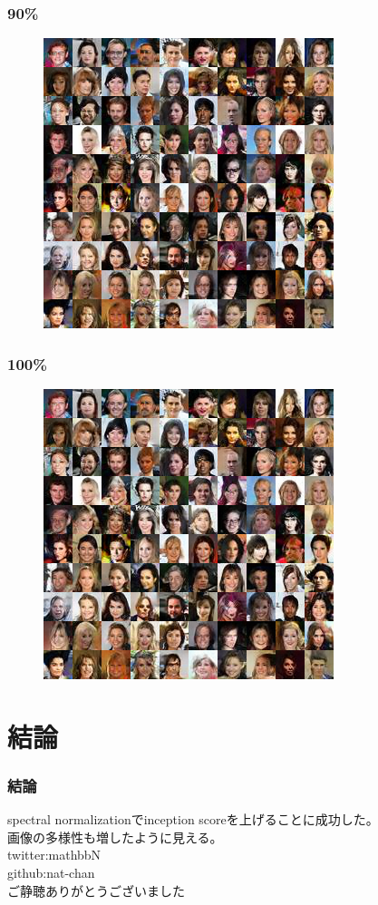 \documentclass[dvipdfmx,12pt]{beamer}
\begin{document}
\begin{frame}
	\frametitle{90\%}
	\begin{figure}[htbp]
	\begin{center}
	\includegraphics[width=0.7\hsize]{./sndcgan/image00090000.png}
	\end{center}
	\end{figure}
\end{frame}
\begin{frame}
	\frametitle{100\%}
	\begin{figure}[htbp]
	\begin{center}
	\includegraphics[width=0.7\hsize]{./sndcgan/image00100000.png}
	\end{center}
	\end{figure}
\end{frame}

\section{結論}
\begin{frame}
	\frametitle{結論}
	spectral normalizationでinception scoreを上げることに成功した。\\
	画像の多様性も増したように見える。\\
	twitter:mathbbN \\
	github:nat-chan \\
	ご静聴ありがとうございました
\end{frame}
\end{document}

